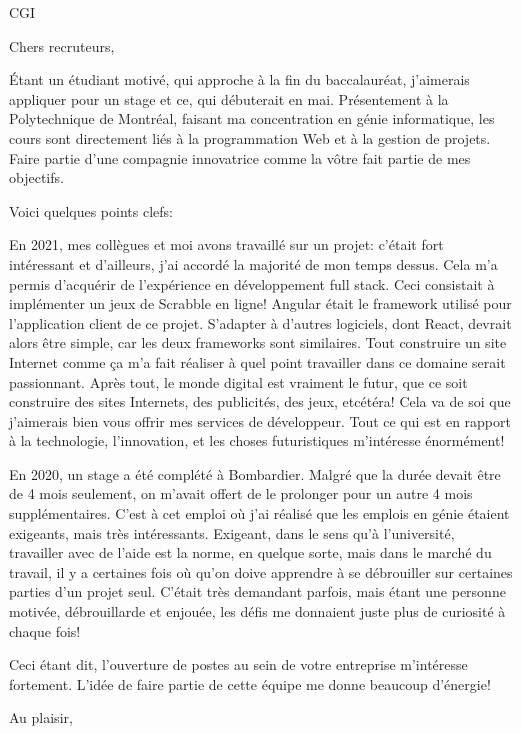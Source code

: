 \documentclass[12pt,french]{letter}
\begin{document}
\pagestyle{headings}

\begin{letter}{CGI}
\address{Montréal, Canada}

\opening{Chers recruteurs,}


Étant un étudiant motivé, qui approche à la fin du baccalauréat, j’aimerais appliquer pour un stage et ce, qui débuterait en mai.  Présentement à la Polytechnique de Montréal, faisant ma concentration en génie informatique, les cours sont directement liés à la programmation Web et à la gestion de projets.  Faire partie d’une compagnie innovatrice comme la vôtre fait partie de mes objectifs.

Voici quelques points clefs:

En 2021, mes collègues et moi avons travaillé sur un projet: c’était fort intéressant et d’ailleurs, j’ai accordé la majorité de mon temps dessus.  Cela m'a permis d’acquérir de l’expérience en développement full stack.  Ceci consistait à implémenter un jeux de Scrabble en ligne! Angular était le framework utilisé pour l'application client de ce projet.  S'adapter à d’autres logiciels, dont React, devrait alors être simple, car les deux frameworks sont similaires. Tout construire un site Internet comme ça m’a fait réaliser à quel point travailler dans ce domaine serait passionnant.  Après tout, le monde digital est vraiment le futur, que ce soit construire des sites Internets, des publicités, des jeux, etcétéra!  Cela va de soi que j’aimerais bien vous offrir mes services de développeur.  Tout ce qui est en rapport à la technologie, l’innovation, et les choses futuristiques m’intéresse énormément! 

En 2020, un stage a été complété à Bombardier.  Malgré que la durée devait être de 4 mois seulement, on m’avait offert de le prolonger pour un autre 4 mois supplémentaires.  C’est à cet emploi où j’ai réalisé que les emplois en génie étaient exigeants, mais très intéressants. Exigeant, dans le sens qu’à l’université, travailler avec de l'aide est la norme, en quelque sorte, mais dans le marché du travail, il y a certaines fois où qu’on doive apprendre à se débrouiller sur certaines parties d’un projet seul.  C’était très demandant parfois, mais étant une personne motivée, débrouillarde et enjouée, les défis me donnaient juste plus de curiosité à chaque fois!

Ceci étant dit, l'ouverture de postes au sein de votre entreprise m’intéresse fortement.
L’idée de faire partie de cette équipe me donne beaucoup d’énergie!


\signature{Maxime Laroche}

\closing{Au plaisir,}


\end{letter}
\end{document}
